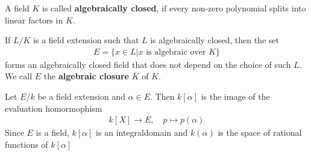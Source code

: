 \begin{dfn}[]
  A field $K$ is called \textbf{algebraically closed}, if every
  non-zero polynomial splits into linear factors in $K$.

  If $L/K$ is a field extension such that $L$ is algebraically closed, then the set
  \begin{align*}
    E = \{x \in L \big\vert x \text{ is algebraic over }K\}
  \end{align*}
  forms an algebraically closed field that does not depend on the choice of such $L$.
  We call $E$ the \textbf{algebraic closure} $\overline{K}$ of $K$.
\end{dfn}

\begin{dfn}[]
  Let $E/k$ be a field extension and $\alpha \in E$. Then $k[\alpha]$ is the image of the evaluation homormophism
  \begin{align*}
    k[X] \to E, \quad p \mapsto  p(\alpha)
  \end{align*}
  Since $E$ is a field, $k[\alpha]$ is an integraldomain and $k(\alpha)$ is the space of rational functions of $k[\alpha]$
\end{dfn}
